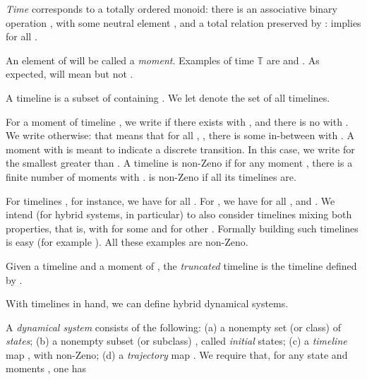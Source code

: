 \documentclass[envcountsame]{llncs}
\newcommand{\TT}{\ensuremath{\mathbb{T}}}
\newcommand{\itm}[1]{\mbox{\rm(}#1\mbox{\rm)}}
\newcommand{\nd}[1]{#1}\let\ep\endproof
\renewcommand{\endproof}{\qed\ep}
\begin{document}
\begin{definition}[Time]
  \emph{Time}   corresponds
to a totally ordered monoid: there is an associative binary
    operation , with some neutral element , and a total relation  preserved
  by :   implies  for all .
\end{definition}


An element of  will be called a \emph{moment}. Examples of time \TT\@
are  and . As expected,  will mean  but not .





\begin{definition}[Timeline]
A timeline is a subset of  containing . We let  denote the set of all timelines.
\end{definition}



For a moment  of timeline ,  we write  if there exists
 with , and there is no  with .
We write  otherwise: that means that for all , ,
there is some in-between  with .
\nd{A moment  with  is meant to indicate a
  discrete transition.  In this case, we write  for the smallest
   greater than .}
A timeline  is non-Zeno if for any moment , there is a
finite number of moments  with .  is
non-Zeno if all its timelines are. 



For timelines , for instance, we have  for all .
    For , we have  for all , and
    .
We intend (for hybrid systems, in particular) to also
    consider timelines  mixing both properties, that is, with
     for some  and  for
    other . Formally building  such timelines is easy (for
      example ). All these examples are non-Zeno.



\begin{definition}[Truncation]
Given a timeline  and a moment  of , the
\emph{truncated} timeline  is the timeline defined by
.
\end{definition}








With timelines in hand, we can define hybrid dynamical systems.

\begin{definition}\label{LTS} \label{def:ts}
A \emph{dynamical  system} 
consists of the following:
\itm{a} a nonempty set (or class)
 of \emph{states};
\itm{b} a nonempty subset (or subclass) , called \emph{initial} states;
\itm{c} a \emph{timeline} map , with  non-Zeno;
\itm{d} a \emph{trajectory} map .
We require that,
for any state  and moments , one has

\end{definition}
\end{document}
